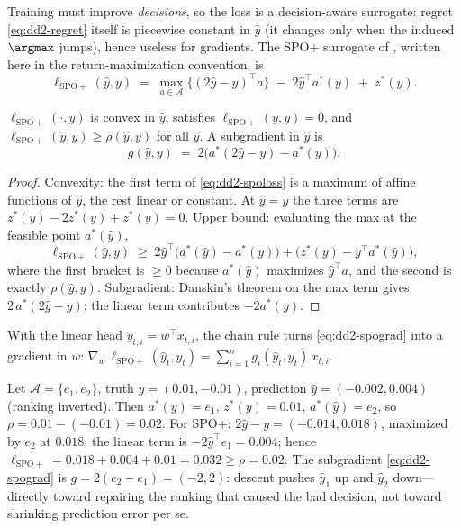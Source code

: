 Training must improve \emph{decisions}, so the loss is a decision-aware
surrogate: regret \eqref{eq:dd2-regret} itself is piecewise constant in
$\hat y$ (it changes only when the induced $\argmax$ jumps), hence useless
for gradients. The SPO+ surrogate of \citet{elmachtoub2022smart}, written
here in the return-maximization convention, is
\begin{equation}
\label{eq:dd2-spoloss}
\ell_{\mathrm{SPO+}}(\hat y, y)
\;=\;
\max_{a \in \mathcal{A}} \bigl\{ (2\hat y - y)^{\top} a \bigr\}
\;-\; 2 \hat y^{\top} a^{*}(y)
\;+\; z^{*}(y).
\end{equation}

\begin{lemma}
\label{lem:dd2-spoplus}
$\ell_{\mathrm{SPO+}}(\cdot, y)$ is convex in $\hat y$, satisfies
$\ell_{\mathrm{SPO+}}(y, y) = 0$, and
$\ell_{\mathrm{SPO+}}(\hat y, y) \ge \rho(\hat y, y)$ for all $\hat y$.
A subgradient in $\hat y$ is
\begin{equation}
\label{eq:dd2-spograd}
g(\hat y, y) \;=\; 2\bigl(a^{*}(2\hat y - y) - a^{*}(y)\bigr).
\end{equation}
\end{lemma}

\begin{proof}
Convexity: the first term of \eqref{eq:dd2-spoloss} is a maximum of affine
functions of $\hat y$, the rest linear or constant. At $\hat y = y$ the
three terms are $z^{*}(y) - 2z^{*}(y) + z^{*}(y) = 0$. Upper bound:
evaluating the max at the feasible point $a^{*}(\hat y)$,
\[
\ell_{\mathrm{SPO+}}(\hat y, y)
\;\ge\; 2\hat y^{\top}\bigl(a^{*}(\hat y) - a^{*}(y)\bigr)
+ \bigl(z^{*}(y) - y^{\top} a^{*}(\hat y)\bigr),
\]
where the first bracket is $\ge 0$ because $a^{*}(\hat y)$ maximizes
$\hat y^{\top} a$, and the second is exactly $\rho(\hat y, y)$.
Subgradient: Danskin's theorem on the max term gives
$2\,a^{*}(2\hat y - y)$; the linear term contributes $-2a^{*}(y)$.
\end{proof}

With the linear head $\hat y_{t,i} = w^{\top} x_{t,i}$, the chain rule turns
\eqref{eq:dd2-spograd} into a gradient in $w$:
$\nabla_{w}\, \ell_{\mathrm{SPO+}}(\hat y_t, y_t)
= \sum_{i=1}^{n} g_i(\hat y_t, y_t)\, x_{t,i}$.

\begin{example}
\label{ex:dd2-spoplus}
Let $\mathcal{A} = \{e_1, e_2\}$, truth $y = (0.01, -0.01)$, prediction
$\hat y = (-0.002, 0.004)$ (ranking inverted). Then $a^{*}(y) = e_1$,
$z^{*}(y) = 0.01$, $a^{*}(\hat y) = e_2$, so
$\rho = 0.01 - (-0.01) = 0.02$. For SPO+:
$2\hat y - y = (-0.014, 0.018)$, maximized by $e_2$ at $0.018$; the linear
term is $-2\hat y^{\top} e_1 = 0.004$; hence
$\ell_{\mathrm{SPO+}} = 0.018 + 0.004 + 0.01 = 0.032 \ge \rho = 0.02$.
The subgradient \eqref{eq:dd2-spograd} is $g = 2(e_2 - e_1) = (-2, 2)$:
descent pushes $\hat y_1$ up and $\hat y_2$ down---directly toward repairing
the ranking that caused the bad decision, not toward shrinking prediction
error per se.
\end{example}

